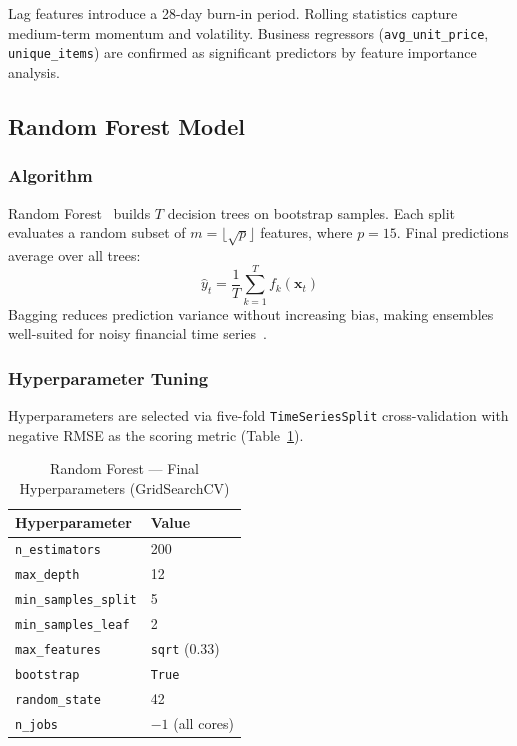 \documentclass[conference]{IEEEtran}
\begin{document}
Lag features introduce a 28-day burn-in period.  Rolling statistics capture medium-term
momentum and volatility.  Business regressors (\texttt{avg\_unit\_price},
\texttt{unique\_items}) are confirmed as significant predictors by feature importance
analysis.

\subsection{Random Forest Model}

\subsubsection{Algorithm}
Random Forest~\cite{breiman2001random} builds $T$ decision trees on bootstrap samples.
Each split evaluates a random subset of $m\!=\!\lfloor\sqrt{p}\rfloor$ features, where
$p\!=\!15$.  Final predictions average over all trees:
\begin{equation}
  \hat{y}_{t} = \frac{1}{T}\sum_{k=1}^{T} f_k(\mathbf{x}_t)
  \label{eq:rf}
\end{equation}
Bagging reduces prediction variance without increasing bias, making ensembles
well-suited for noisy financial time series~\cite{breiman2001random}.

\subsubsection{Hyperparameter Tuning}

Hyperparameters are selected via five-fold \texttt{TimeSeriesSplit} cross-validation
with negative RMSE as the scoring metric (Table~\ref{tab:hp}).

\begin{table}[H]
\centering
\caption{Random Forest — Final Hyperparameters (GridSearchCV)}
\label{tab:hp}
\scriptsize
\begin{tabular}{@{}ll@{}}
\toprule
\textbf{Hyperparameter}      & \textbf{Value}       \\
\midrule
\texttt{n\_estimators}       & 200                  \\
\texttt{max\_depth}          & 12                   \\
\texttt{min\_samples\_split} & 5                    \\
\texttt{min\_samples\_leaf}  & 2                    \\
\texttt{max\_features}       & \texttt{sqrt} (0.33) \\
\texttt{bootstrap}           & \texttt{True}        \\
\texttt{random\_state}       & 42                   \\
\texttt{n\_jobs}             & $-1$ (all cores)     \\
\bottomrule
\end{tabular}
\end{table}
\end{document}
